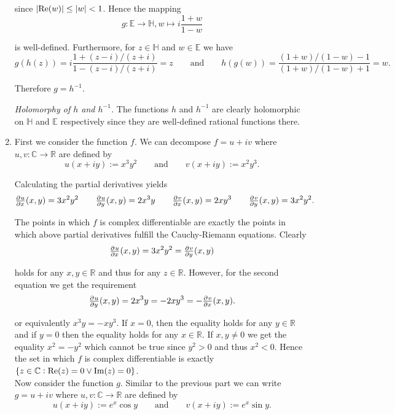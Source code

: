 \begin{enumerate}[label = \textbf{Exercise \arabic*.},wide = 0pt, itemsep=1.5ex]
	\noindent since $\abs[0]{\Re(w)} \leq \abs[0]{w} < 1$. Hence the mapping
	\begin{equation}
		g: \mathbb{E} \to \mathbb{H}, w \mapsto i\frac{1 + w}{1 - w}
	\end{equation}

	\noindent is well-defined. Furthermore, for $z \in \mathbb{H}$ and $w \in \mathbb{E}$ we have
	\begin{equation*}
		g(h(z)) = i\frac{1 + (z - i)/(z + i)}{1 - (z - i)/(z + i)} = z \qquad \text{and} \qquad h(g(w)) = \frac{(1 + w)/(1-w)- 1}{(1 + w)/(1-w) + 1} = w.
	\end{equation*}

	Therefore $g = h^{-1}$.

	\emph{Holomorphy of $h$ and $h^{-1}$.} The functions $h$ and $h^{-1}$ are clearly holomorphic on $\mathbb{H}$ and $\mathbb{E}$ respectively since they are well-defined rational functions there.
\item
	First we consider the function $f$. We can decompose $f = u + iv$ where $u,v: \mathbb{C} \to \mathbb{R}$ are defined by
	\begin{equation}
		u(x + iy) := x^3y^2 \qquad \text{and} \qquad v(x + iy) := x^2y^3.	
	\end{equation}

	Calculating the partial derivatives yields
	\begin{equation*}
		\pd{u}{x}(x,y) = 3x^2y^2 \qquad \pd{u}{y}(x,y) = 2x^3y \qquad \pd{v}{x}(x,y) = 2xy^3 \qquad \pd{v}{y}(x,y) = 3x^2 y^2.
	\end{equation*}

	The points in which $f$ is complex differentiable are exactly the points in which above partial derivatives fulfill the Cauchy-Riemann equations. Clearly 
	\begin{equation}
		\pd{u}{x}(x,y) = 3x^2 y^2 = \pd{v}{y}(x,y)
	\end{equation}

	\noindent holds for any $x,y \in \mathbb{R}$ and thus for any $z \in \mathbb{R}$. However, for the second equation we get the requirement
	\begin{equation}
		\pd{u}{y}(x,y) = 2x^3y = -2xy^3 = -\pd{v}{x}(x,y). 
	\end{equation}

	\noindent or equivalently $x^3y = -xy^3$. If $x = 0$, then the equality holds for any $y \in \mathbb{R}$ and if $y = 0$ then the equality holds for any $x \in \mathbb{R}$. If $x,y \neq 0$ we get the equality $x^2 = -y^2$ which cannot be true since $y^2 > 0$ and thus $x^2 < 0$. Hence the set in which $f$ is complex differentiable is exactly $\cbr[0]{z \in \mathbb{C} : \Re(z) = 0 \vee \Im(z) = 0}$.\\
	Now consider the function $g$. Similar to the previous part we can write $g = u + iv$ where $u,v: \mathbb{C} \to \mathbb{R}$ are defined by 
	\begin{equation}
		u(x + iy) := e^x\cos y \qquad \text{and} \qquad v(x + iy) := e^x \sin y.	
	\end{equation}


\end{enumerate}
